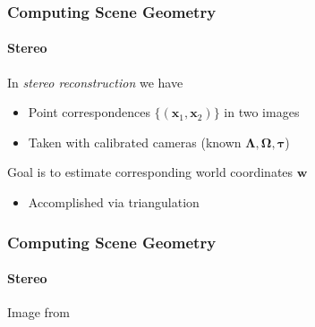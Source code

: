 \documentclass[xetex,professionalfont]{beamer}
\renewcommand{\vec}[1]{\ensuremath{\mathbf{#1}}}
\newcommand{\vw}{\vec{w}}
\newcommand{\vx}{\vec{x}}
\newcommand{\intr}{\boldsymbol{\Lambda}}
\begin{document}

\begin{frame}
\frametitle{Computing Scene Geometry}
\framesubtitle{Stereo}

In \emph{stereo reconstruction} we have
\begin{itemize}
    \item Point correspondences $\{(\vx_1,\vx_2)\}$ in two images %
    \item Taken with calibrated cameras (known $\intr, \boldsymbol{\Omega}, \boldsymbol{\tau}$)
\end{itemize}

\bigskip
Goal is to estimate corresponding world coordinates $\vw$
\begin{itemize}
    \item Accomplished via triangulation %
\end{itemize}

\end{frame}


\begin{frame}
\frametitle{Computing Scene Geometry}
\framesubtitle{Stereo}

\begin{center}
    {\centering Image from \cite{prince12}}
\end{center}

\end{frame}

\end{document}
